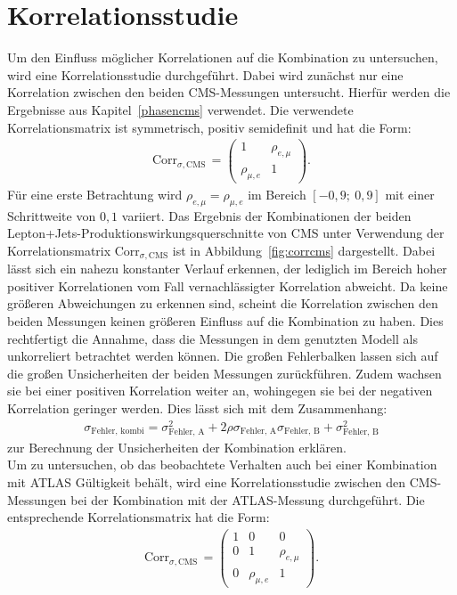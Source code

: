 \section{Korrelationsstudie}
Um den Einfluss möglicher Korrelationen auf die Kombination zu untersuchen, wird eine Korrelationsstudie durchgeführt. Dabei wird zunächst nur eine Korrelation zwischen den beiden CMS-Messungen untersucht. Hierfür werden die Ergebnisse aus Kapitel~\ref{phasencms} verwendet. Die verwendete Korrelationsmatrix ist symmetrisch, positiv semidefinit und hat die Form:
\begin{align}
  \text{Corr}_{\sigma,\text{CMS}}\,=\begin{pmatrix}
  1 & \rho_{e, \mu}\\
  \rho_{\mu, e} & 1
  \end{pmatrix}.
  \label{eqn:matrix1}
\end{align}
Für eine erste Betrachtung wird $\rho_{e, \mu}= \rho_{\mu, e}$ im Bereich $[-0,9;~0,9]$ mit einer Schrittweite von $0,1$ variiert. Das Ergebnis der Kombinationen der beiden Lepton+Jets-Produktionswirkungsquerschnitte von CMS unter Verwendung der Korrelationsmatrix $\text{Corr}_{\sigma,\text{CMS}}$ ist in Abbildung~\ref{fig:corrcms} dargestellt. Dabei lässt sich ein nahezu konstanter Verlauf erkennen, der lediglich im Bereich hoher positiver Korrelationen vom Fall vernachlässigter Korrelation abweicht. Da keine größeren Abweichungen zu erkennen sind, scheint die Korrelation zwischen den beiden Messungen keinen größeren Einfluss auf die Kombination zu haben.
Dies rechtfertigt die Annahme, dass die Messungen in dem genutzten Modell als unkorreliert betrachtet werden können. Die großen Fehlerbalken lassen sich auf die großen Unsicherheiten der beiden Messungen zurückführen. Zudem wachsen sie bei einer positiven Korrelation weiter an, wohingegen sie bei der negativen Korrelation geringer werden. Dies lässt sich mit dem Zusammenhang:
\begin{align}
  \sigma_{\text{Fehler, kombi}} = \sigma_{\text{Fehler, A}}^2 + 2\rho\sigma_{\text{Fehler, A}}\sigma_{\text{Fehler, B}} + \sigma_{\text{Fehler, B}}^2
\end{align}
zur Berechnung der Unsicherheiten der Kombination erklären.\\
Um zu untersuchen, ob das beobachtete Verhalten auch bei einer Kombination mit ATLAS Gültigkeit behält, wird eine Korrelationsstudie zwischen den CMS-Messungen bei der Kombination mit der ATLAS-Messung durchgeführt. Die entsprechende Korrelationsmatrix hat die Form:
\begin{align}
  \text{Corr}_{\sigma,\text{CMS}}\,=\begin{pmatrix}
  1 & 0 & 0\\
  0 & 1 &\rho_{e, \mu}\\
  0 & \rho_{\mu, e} & 1
  \end{pmatrix}.
  \label{eqn:matrix2}
\end{align}
